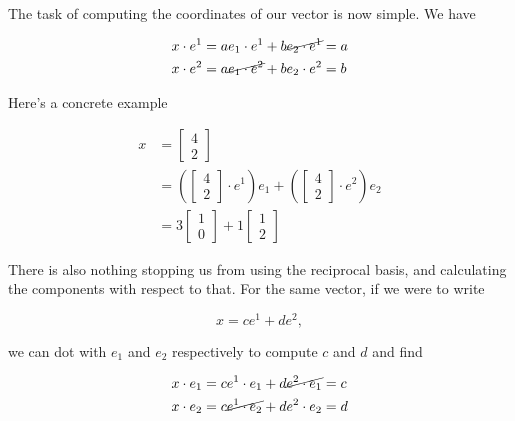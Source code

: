 \documentclass[iop,onecolumn]{emulateapj}
\begin{document}
The task of computing the coordinates of our vector is now simple.  We have

\begin{equation}\label{eqn:grahamSchmidtLorentz:340}
\begin{aligned}
x \cdot e^1 &= a e_1 \cdot e^1 + b \cancel{e_2 \cdot e^1} = a \\
x \cdot e^2 &= a \cancel{e_1 \cdot e^2} + b e_2 \cdot e^2 = b
\end{aligned}
\end{equation}

Here's a concrete example

\begin{equation}\label{eqn:grahamSchmidtLorentz:230}
\begin{aligned}
x &=
\begin{bmatrix}
4 \\
2
\end{bmatrix}  \\
&=
\left(
\begin{bmatrix}
4 \\
2
\end{bmatrix}
\cdot e^1
\right)
e_1
+
\left(
\begin{bmatrix}
4 \\
2
\end{bmatrix}
\cdot e^2
\right)
e_2 \\
&= 3
\begin{bmatrix}
1 \\
0
\end{bmatrix}
+
1
\begin{bmatrix}
1 \\
2
\end{bmatrix}
\end{aligned}
\end{equation}

There is also nothing stopping us from using the reciprocal basis, and calculating the components with respect to that.  For the same vector, if we were to write

\begin{equation}\label{eqn:grahamSchmidtLorentz:250}
x = c e^1 + d e^2,
\end{equation}

we can dot with $e_1$ and $e_2$ respectively to compute $c$ and $d$ and find

\begin{equation}\label{eqn:grahamSchmidtLorentz:360}
\begin{aligned}
x \cdot e_1 &= c e^1 \cdot e_1 + d \cancel{e^2 \cdot e_1} = c \\
x \cdot e_2 &= c \cancel{e^1 \cdot e_2} + d e^2 \cdot e_2 = d
\end{aligned}
\end{equation}
\end{document}
